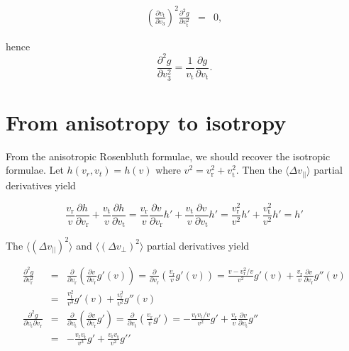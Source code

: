 \documentclass[11pt]{article}
\newcommand{\rt}{\mathrm{t}}
\newcommand{\rr}{\mathrm{r}}
\newcommand{\vr}{v_{\rr}}
\newcommand{\vt}{v_{\rt}}
\newcommand{\dvPar}{\Delta v_{||}}
\newcommand{\dvPerp}{\Delta v_{\perp}}
\newcommand{\dvParAvrLoc}{\langle \dvPar \rangle}
\newcommand{\dvParSqAvrLoc}{\langle(\dvPar)^{2}\rangle}
\newcommand{\dvPerpSqAvrLoc}{\langle(\dvPerp)^{2}\rangle}
\begin{document}
\begin{appendices}
\begin{equation}
\begin{array}{ccl}
  \displaystyle{\left(\frac{\partial \vt}{\partial v_{3}}\right)^{2}\frac{\partial^{2}g}{\partial \vt^{2}}}&=& \displaystyle{0} ,
\end{array}
\label{eq:d2gdv32_Coeffs_Special}
\end{equation}

hence
\begin{equation}
  \frac{\partial^{2}g}{\partial v_{3}^{2}}  = \frac{1}{\vt}\frac{\partial g}{\partial \vt} .
   \label{eq:d2gdv32_Special}
\end{equation}

\section{From anisotropy to isotropy}
\label{app:Aniso_To_Iso}
From the anisotropic Rosenbluth formulae, we should recover the isotropic formulae. Let $h(v_{r},v_{t})=h(v)$ where $v^{2}=\vr^{2}+\vt^{2}$. Then the $\dvParAvrLoc$ partial derivatives yield

\begin{equation}
\frac{\vr}{v}\frac{\partial h}{\partial \vr}+\frac{\vt}{v}\frac{\partial h}{\partial \vt}=\frac{\vr}{v}\frac{\partial v}{\partial \vr}h'+\frac{\vt}{v}\frac{\partial v}{\partial \vt}h'=\frac{\vr^{2}}{v^{2}}h'+\frac{\vt^{2}}{v^{2}}h'=h'
\label{eq:AniToIso_d1}
\end{equation}

The $\dvParSqAvrLoc$ and $\dvPerpSqAvrLoc$ partial derivatives yield

\begin{equation}
  \begin{array}{ccl}
\displaystyle{\frac{\partial^{2}g}{\partial \vr^{2}}}& =&\displaystyle{\frac{\partial}{\partial \vr}(\frac{\partial v}{\partial \vr}g'(v))=\frac{\partial}{\partial\vr}(\frac{\vr}{v}g'(v))=\frac{v-\vr^{2}/v}{v^{2}}g'(v)+\frac{\vr}{v}\frac{\partial v}{\partial \vr}g''(v)}\\
     {}& =&\displaystyle{\frac{\vt^{2}}{v^{3}}g'(v)+\frac{\vr^{2}}{v^{2}}g''(v)}\\

\displaystyle{\frac{\partial^{2}g}{\partial \vt\partial \vr}}&=&\displaystyle{\frac{\partial}{\partial\vt}(\frac{\partial v}{\partial \vr}g')=\frac{\partial}{\partial \vt}(\frac{\vr}{v}g')=-\frac{\vr\vt/v}{v^{2}}g'+\frac{\vr}{v}\frac{\partial v}{\partial\vt}g''}\\
     {}& =&\displaystyle{-\frac{\vr\vt}{v^{3}}g'+\frac{\vr\vt}{v^{2}}g'}'\\


\end{array}
\end{equation}
\end{appendices}
\end{document}
